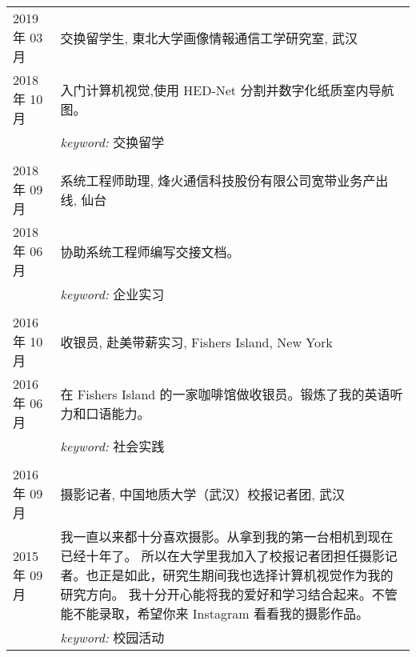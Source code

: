 %
%


\begin{longtable}{R{2.5cm}|p{14.8cm}}
	\textsc{2019 年 03 月} & 交换留学生, \textsc{東北大学画像情報通信工学研究室}, 武汉                               \\
	\textsc{2018 年 10 月} & \footnotesize{入门计算机视觉,使用 HED-Net 分割并数字化纸质室内导航图。}                 \\&
	\footnotesize{\emph{keyword:} 交换留学 }                                                                         \\
	                                                                                             \\

	\textsc{2018 年 09 月} & 系统工程师助理, \textsc{烽火通信科技股份有限公司宽带业务产出线}, 仙台                   \\
	\textsc{2018 年 06 月} & \footnotesize{协助系统工程师编写交接文档。 }                                            \\&
	\footnotesize{\emph{keyword:} 企业实习 }                                                                         \\
	                                                                                             \\

	\textsc{2016 年 10 月} & 收银员, \textsc{赴美带薪实习}, Fishers Island, New York                                 \\
	\textsc{2016 年 06 月} & \footnotesize{ 在 Fishers Island 的一家咖啡馆做收银员。锻炼了我的英语听力和口语能力。 } \\&
	\footnotesize{\emph{keyword:} 社会实践 }                                                                         \\
	                                                                                             \\

	\textsc{2016 年 09 月} & 摄影记者, \textsc{中国地质大学（武汉）校报记者团}, 武汉                                 \\
	\textsc{2015 年 09 月} & \footnotesize{我一直以来都十分喜欢摄影。从拿到我的第一台相机到现在已经十年了。
		所以在大学里我加入了校报记者团担任摄影记者。也正是如此，研究生期间我也选择计算机视觉作为我的研究方向。
		我十分开心能将我的爱好和学习结合起来。不管能不能录取，希望你来 Instagram 看看我的摄影作品。}                     \\&
	\footnotesize{\emph{keyword:} 校园活动 }                                                                         \\
\end{longtable}
